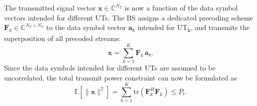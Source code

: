 The transmitted signal vector $\mathbf{x} \in \mathbb{C}^{N_T}$ is now a function of the data symbol vectors intended for different \acp{UT}. The \ac{BS} assigns a dedicated precoding scheme $\mathbf{F}_k \in \mathbb{C}^{N_T \times N_S}$ to the data symbol vector $\mathbf{a}_k$ intended for \ac{UT}\textsubscript{k}, and transmits the superposition of all precoded streams:
\begin{equation}
    \mathbf{x} = \sum_{k=1}^{K} \mathbf{F}_k \, \mathbf{a}_k.
\label{eq:mu_mimo_precoding}
\end{equation}
Since the data symbols intended for different \acp{UT} are assumed to be uncorrelated, the total transmit power constraint can now be formulated as
\begin{equation}
    \mathbb{E}\!\left[\|\mathbf{x}\|^2\right] = \sum_{k=1}^{K} \mathrm{tr}\!\left(\mathbf{F}_k^H \mathbf{F}_k\right) \leq P_t.
\label{eq:Pt_constraint_mu}
\end{equation}

